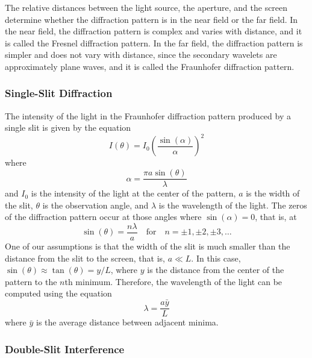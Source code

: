 \documentclass[10pt]{article}
\begin{document}
The relative distances between the light source, the aperture, and the screen determine whether the diffraction pattern is in the near field or the far field. In the near field, the diffraction pattern is complex and varies with distance, and it is called the Fresnel diffraction pattern. In the far field, the diffraction pattern is simpler and does not vary with distance, since the secondary wavelets are approximately plane waves, and it is called the Fraunhofer diffraction pattern.

\subsubsection*{Single-Slit Diffraction}

The intensity of the light in the Fraunhofer diffraction pattern produced by a single slit is given by the equation
\begin{equation}
  I(\theta) = I_0 \left( \frac{\sin(\alpha)}{\alpha} \right)^2
  \label{eq:single-slit-intensity}
\end{equation}
where
\begin{equation}
  \alpha = \frac{\pi a \sin(\theta)}{\lambda}
\end{equation}
and $I_0$ is the intensity of the light at the center of the pattern, $a$ is the width of the slit, $\theta$ is the observation angle, and $\lambda$ is the wavelength of the light. The zeros of the diffraction pattern occur at those angles where $\sin(\alpha) = 0$, that is, at
\begin{equation}
  \sin(\theta) = \frac{n \lambda}{a} \quad \text{for} \quad n = \pm 1, \pm 2, \pm 3, \ldots
\end{equation}
One of our assumptions is that the width of the slit is much smaller than the distance from the slit to the screen, that is, $a \ll L$. In this case, $\sin(\theta) \approx \tan(\theta) = y/L$, where $y$ is the distance from the center of the pattern to the $n$th minimum. Therefore, the wavelength of the light can be computed using the equation
\begin{equation}
  \lambda = \frac{a \bar{y}}{L}
\end{equation}
where $\bar{y}$ is the average distance between adjacent minima. 

\subsubsection*{Double-Slit Interference}
\end{document}
